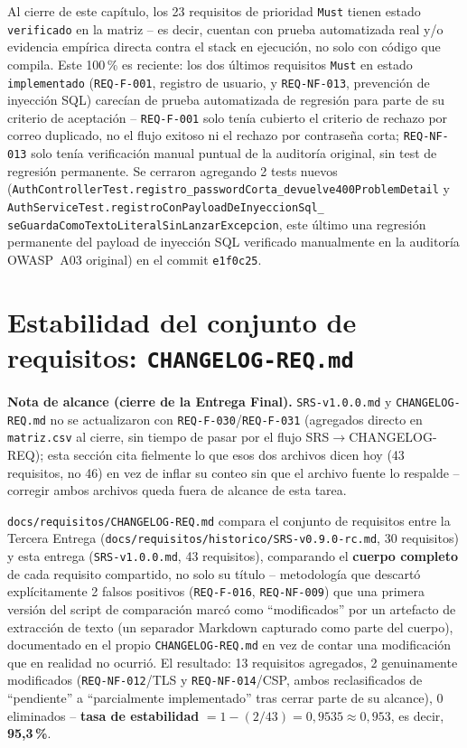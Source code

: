 Al cierre de este capítulo, los 23 requisitos de prioridad \texttt{Must}
tienen estado \texttt{verificado} en la matriz -- es decir, cuentan con
prueba automatizada real y/o evidencia empírica directa contra el stack
en ejecución, no solo con código que compila. Este 100\,\% es reciente:
los dos últimos requisitos \texttt{Must} en estado \texttt{implementado}
(\texttt{REQ-F-001}, registro de usuario, y \texttt{REQ-NF-013},
prevención de inyección SQL) carecían de prueba automatizada de
regresión para parte de su criterio de aceptación -- \texttt{REQ-F-001}
solo tenía cubierto el criterio de rechazo por correo duplicado, no el
flujo exitoso ni el rechazo por contraseña corta; \texttt{REQ-NF-013}
solo tenía verificación manual puntual de la auditoría original, sin
test de regresión permanente. Se cerraron agregando 2 tests nuevos
(\texttt{AuthControllerTest.registro\_passwordCorta\_devuelve400ProblemDetail}
y
\texttt{AuthServiceTest.registroConPayloadDeInyeccionSql\_} \texttt{seGuardaComoTextoLiteralSinLanzarExcepcion},
este último una regresión permanente del payload de inyección SQL
verificado manualmente en la auditoría OWASP~A03 original) en el commit
\texttt{e1f0c25}.

\section{Estabilidad del conjunto de requisitos: \texttt{CHANGELOG-REQ.md}}

\textbf{Nota de alcance (cierre de la Entrega Final).}
\texttt{SRS-v1.0.0.md} y \texttt{CHANGELOG-REQ.md} no se actualizaron
con \texttt{REQ-F-030}/\texttt{REQ-F-031} (agregados directo en
\texttt{matriz.csv} al cierre, sin tiempo de pasar por el flujo
SRS$\to$CHANGELOG-REQ); esta sección cita fielmente lo que esos dos
archivos dicen hoy (43 requisitos, no 46) en vez de inflar su conteo sin
que el archivo fuente lo respalde -- corregir ambos archivos queda fuera
de alcance de esta tarea.

\texttt{docs/requisitos/CHANGELOG-REQ.md} compara el conjunto de
requisitos entre la Tercera Entrega
(\texttt{docs/requisitos/historico/SRS-v0.9.0-rc.md}, 30 requisitos) y
esta entrega (\texttt{SRS-v1.0.0.md}, 43 requisitos), comparando el
\textbf{cuerpo completo} de cada requisito compartido, no solo su
título -- metodología que descartó explícitamente 2 falsos positivos
(\texttt{REQ-F-016}, \texttt{REQ-NF-009}) que una primera versión del
script de comparación marcó como ``modificados'' por un artefacto de
extracción de texto (un separador Markdown capturado como parte del
cuerpo), documentado en el propio \texttt{CHANGELOG-REQ.md} en vez de
contar una modificación que en realidad no ocurrió. El resultado: 13
requisitos agregados, 2 genuinamente modificados
(\texttt{REQ-NF-012}/TLS y \texttt{REQ-NF-014}/CSP, ambos reclasificados
de ``pendiente'' a ``parcialmente implementado'' tras cerrar parte de su
alcance), 0 eliminados -- \textbf{tasa de estabilidad} $=1-(2/43)=0{,}9535\approx0{,}953$,
es decir, \textbf{95{,}3\,\%}.

